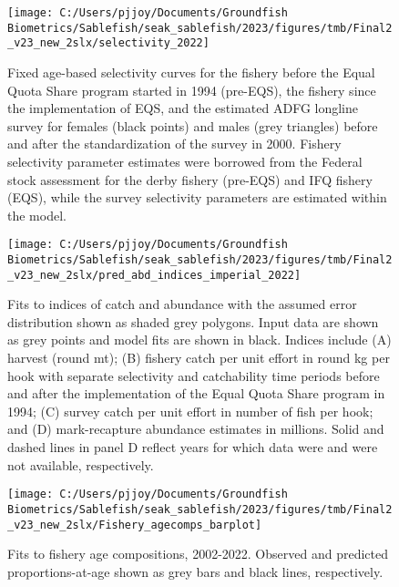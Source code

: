 \documentclass[
]{article}
\begin{document}
\begin{figure}[H]

{\centering \texttt{[image: C:/Users/pjjoy/Documents/Groundfish Biometrics/Sablefish/seak\_sablefish/2023/figures/tmb/Final2\_v23\_new\_2slx/selectivity\_2022]} 

}

\caption{Fixed age-based selectivity curves for the fishery before the Equal Quota Share program started in 1994 (pre-EQS), the fishery since the implementation of EQS, and the estimated ADFG longline survey for females (black points) and males (grey triangles) before and after the standardization of the survey in 2000. Fishery selectivity parameter estimates were borrowed from the Federal stock assessment for the derby fishery (pre-EQS) and IFQ fishery (EQS), while the survey selectivity parameters are estimated within the model.}\label{fig:slx}
\end{figure}

\begin{figure}[H]

{\centering \texttt{[image: C:/Users/pjjoy/Documents/Groundfish Biometrics/Sablefish/seak\_sablefish/2023/figures/tmb/Final2\_v23\_new\_2slx/pred\_abd\_indices\_imperial\_2022]} 

}

\caption{Fits to indices of catch and abundance with the assumed error distribution shown as shaded grey polygons. Input data are shown as grey points and model fits are shown in black. Indices include (A) harvest (round mt); (B) fishery catch per unit effort in round kg per hook with separate selectivity and catchability time periods before and after the implementation of the Equal Quota Share program in 1994; (C) survey catch per unit effort in number of fish per hook; and (D) mark-recapture abundance estimates in millions. Solid and dashed lines in panel D reflect years for which data were and were not available, respectively.}\label{fig:predabdind}
\end{figure}

\begin{figure}[H]

{\centering \texttt{[image: C:/Users/pjjoy/Documents/Groundfish Biometrics/Sablefish/seak\_sablefish/2023/figures/tmb/Final2\_v23\_new\_2slx/Fishery\_agecomps\_barplot]} 

}

\caption{Fits to fishery age compositions, 2002-2022. Observed and predicted proportions-at-age shown as grey bars and black lines, respectively.}\label{fig:fshage}
\end{figure}
\end{document}
